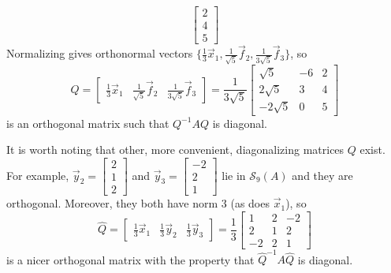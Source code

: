 \documentclass{ximera}
\begin{document}
\begin{example}
\begin{explanation}
\begin{equation*}
\begin{bmatrix}
2 \\
4 \\
5
\end{bmatrix}
\end{equation*}
Normalizing gives orthonormal vectors $\{\frac{1}{3}\vec{x}_{1}, \frac{1}{\sqrt{5}}\vec{f}_{2}, \frac{1}{3\sqrt{5}}\vec{f}_{3}\}$, so
\begin{equation*}
Q = \begin{bmatrix}
\frac{1}{3}\vec{x}_{1} & \frac{1}{\sqrt{5}}\vec{f}_{2} & \frac{1}{3\sqrt{5}}\vec{f}_{3}
\end{bmatrix} = \frac{1}{3\sqrt{5}}\begin{bmatrix}
\sqrt{5} & -6 & 2 \\
2\sqrt{5} & 3 & 4 \\
-2\sqrt{5} & 0 & 5
\end{bmatrix}
\end{equation*}
is an orthogonal matrix such that $Q^{-1}AQ$ is diagonal.


It is worth noting that other, more convenient, diagonalizing matrices $Q$ exist. For example, $\vec{y}_{2} = \begin{bmatrix}
2 \\
1 \\
2
\end{bmatrix}$ and $\vec{y}_{3} = \begin{bmatrix}
-2 \\
2 \\
1
\end{bmatrix}$
 lie in $\mathcal{S}_{9}(A)$ and they are orthogonal. Moreover, they both have norm $3$ (as does $\vec{x}_{1}$), so
\begin{equation*}
\hat{Q} = \begin{bmatrix}
\frac{1}{3}\vec{x}_{1} & \frac{1}{3}\vec{y}_{2} & \frac{1}{3}\vec{y}_{3}
\end{bmatrix} = \frac{1}{3}\begin{bmatrix}
1 & 2 & -2 \\
2 & 1 & 2 \\
-2 & 2 & 1
\end{bmatrix}
\end{equation*}
is a nicer orthogonal matrix with the property that $\hat{Q}^{-1}A\hat{Q}$ is diagonal.
\end{explanation}
\end{example}
\end{document}
